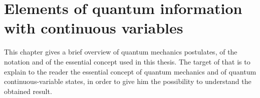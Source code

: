 \chapter{Elements of quantum information with continuous variables}
    This chapter gives a brief overview of quantum mechanics postulates,
    of the notation and of the essential concept used in this thesis. 
    The target of that is to explain to the reader the essential concept of quantum mechanics
    and of quantum continuous-variable states, in 
    order to give him the possibility to understand the obtained result.

    



    
    
    

    

